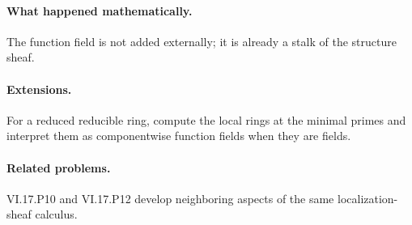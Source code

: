 \paragraph{What happened mathematically.}
The function field is not added externally; it is already a stalk of the structure sheaf.

\paragraph{Extensions.}
For a reduced reducible ring, compute the local rings at the minimal primes and interpret them as componentwise function fields when they are fields.

\paragraph{Related problems.}
VI.17.P10 and VI.17.P12 develop neighboring aspects of the same localization-sheaf calculus.
\fi
